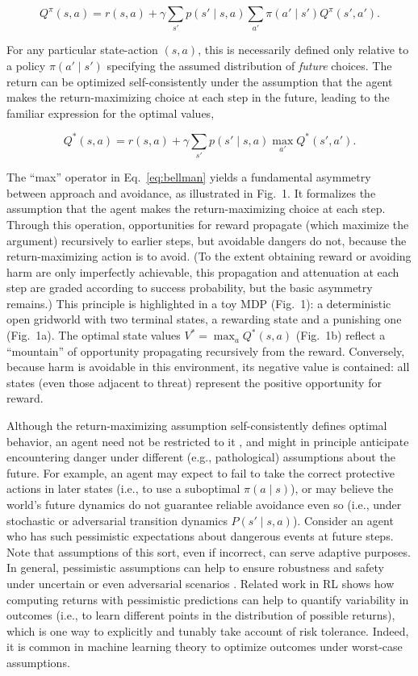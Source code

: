 \documentclass[11pt]{article} %
\begin{document}
\begin{equation*}
Q^\pi(s,a) = r(s,a) + \gamma \sum_{s'} p(s' \mid s,a) \sum_{a'} \pi(a' \mid s') Q^\pi(s',a').
\end{equation*}

For any particular state-action $(s,a)$, this is necessarily defined only relative to a policy $\pi(a' \mid s')$ specifying the assumed distribution of \emph{future} choices. The return can be optimized self-consistently under the assumption that the agent makes the return-maximizing choice at each step in the future, leading to the familiar expression for the optimal values,

\begin{equation}\label{eq:bellman}
 Q^*(s,a) = r(s,a) + \gamma \sum_{s'} p(s' \mid s,a) \max_{a'} Q^*(s',a').
\end{equation}

The ``max'' operator in Eq.~\ref{eq:bellman} yields a fundamental asymmetry between approach and avoidance, as illustrated in Fig.~1. It formalizes the assumption that the agent makes the return-maximizing choice at each step. Through this operation, opportunities for reward propagate (which maximize the argument) recursively to earlier steps, but avoidable dangers do not, because the return-maximizing action is to avoid. (To the extent obtaining reward or avoiding harm are only imperfectly achievable, this propagation and attenuation at each step are graded according to success probability, but the basic asymmetry remains.) This principle is highlighted in a toy MDP (Fig.~1): a deterministic open gridworld with two terminal states, a rewarding state and a punishing one (Fig.~1a). The optimal state values $V^* = \max_a Q^*(s,a)$ (Fig.~1b) reflect a ``mountain'' of opportunity propagating recursively from the reward. Conversely, because harm is avoidable in this environment, its negative value is contained: all states (even those adjacent to threat) represent the positive opportunity for reward.

Although the return-maximizing assumption self-consistently defines optimal behavior, an agent need not be restricted to it \citep{symmonds2010}, and might in principle anticipate encountering danger under different (e.g., pathological) assumptions about the future. For example, an agent may expect to fail to take the correct protective actions in later states (i.e., to use a suboptimal $\pi(a \mid s)$), or may believe the world's future dynamics do not guarantee reliable avoidance even so (i.e., under stochastic or adversarial transition dynamics $P(s' \mid s,a)$). Consider an agent who has such pessimistic expectations about dangerous events at future steps. Note that assumptions of this sort, even if incorrect, can serve adaptive purposes. In general, pessimistic assumptions can help to ensure robustness and safety under uncertain or even adversarial scenarios \cite{Garcia2015}. Related work in RL shows how computing returns with pessimistic predictions can help to quantify variability in outcomes (i.e., to learn different points in the distribution of possible returns)\cite{bellemare2017}, which is one way to explicitly and tunably take account of risk tolerance. Indeed, it is common in machine learning theory to optimize outcomes under worst-case assumptions. 
\end{document}
